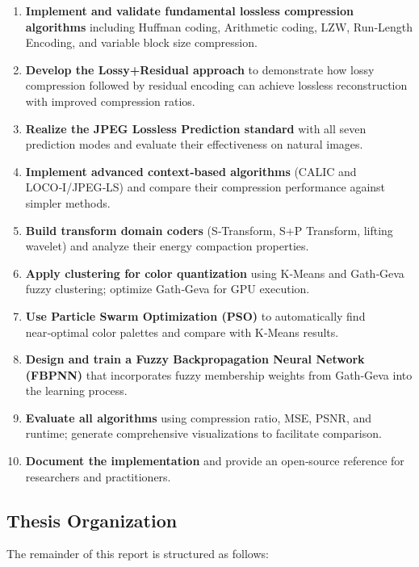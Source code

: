 \begin{enumerate}
    \item \textbf{Implement and validate fundamental lossless compression algorithms} including Huffman coding, Arithmetic coding, LZW, Run‑Length Encoding, and variable block size compression.
    \item \textbf{Develop the Lossy+Residual approach} to demonstrate how lossy compression followed by residual encoding can achieve lossless reconstruction with improved compression ratios.
    \item \textbf{Realize the JPEG Lossless Prediction standard} with all seven prediction modes and evaluate their effectiveness on natural images.
    \item \textbf{Implement advanced context‑based algorithms} (CALIC and LOCO‑I/JPEG‑LS) and compare their compression performance against simpler methods.
    \item \textbf{Build transform domain coders} (S‑Transform, S+P Transform, lifting wavelet) and analyze their energy compaction properties.
    \item \textbf{Apply clustering for color quantization} using K‑Means and Gath‑Geva fuzzy clustering; optimize Gath‑Geva for GPU execution.
    \item \textbf{Use Particle Swarm Optimization (PSO)} to automatically find near‑optimal color palettes and compare with K‑Means results.
    \item \textbf{Design and train a Fuzzy Backpropagation Neural Network (FBPNN)} that incorporates fuzzy membership weights from Gath‑Geva into the learning process.
    \item \textbf{Evaluate all algorithms} using compression ratio, MSE, PSNR, and runtime; generate comprehensive visualizations to facilitate comparison.
    \item \textbf{Document the implementation} and provide an open‑source reference for researchers and practitioners.
\end{enumerate}

\subsection{Thesis Organization}

The remainder of this report is structured as follows:


